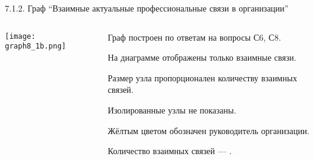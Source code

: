 \begin{frame}{7.1.2. Граф ``Взаимные актуальные профессиональные связи в организации''}

\begin{columns}
\begin{column}{0.75\textwidth} 
\centering
          \texttt{[image: graph8\_1b.png]}
\end{column}
\begin{column}{0.25\textwidth} 

\tiny
Граф построен по ответам на вопросы С6, С8.
\smallskip

На диаграмме отображены только взаимные связи.
\smallskip

Размер узла пропорционален количеству взаимных связей.
\smallskip

Изолированные узлы не показаны.
\smallskip

Жёлтым цветом обозначен руководитель организации.
\bigskip

Количество взаимных связей --- \valHABlinks.


\end{column}
\end{columns}
\end{frame}


